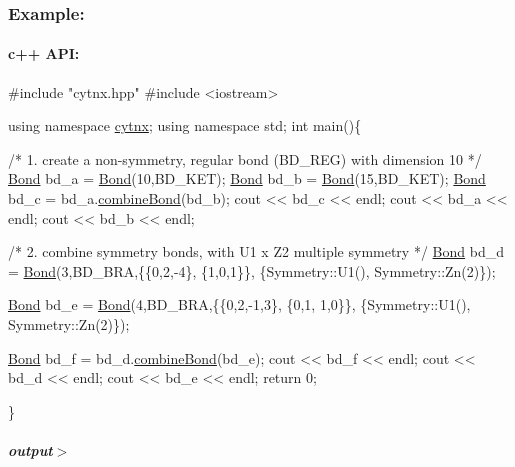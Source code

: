 \subsubsection*{Example\+:}

\paragraph*{c++ A\+PI\+:}


\begin{DoxyCodeInclude}
\textcolor{preprocessor}{#include "cytnx.hpp"}
\textcolor{preprocessor}{#include <iostream>}


\textcolor{keyword}{using namespace }\hyperlink{namespacecytnx}{cytnx};
\textcolor{keyword}{using namespace }std;
\textcolor{keywordtype}{int} main()\{ 

    \textcolor{comment}{/* 1.}
\textcolor{comment}{        create a non-symmetry, regular bond (BD\_REG) }
\textcolor{comment}{        with dimension 10}
\textcolor{comment}{    */}
    \hyperlink{classcytnx_1_1Bond}{Bond} bd\_a = \hyperlink{classcytnx_1_1Bond}{Bond}(10,BD\_KET);
    \hyperlink{classcytnx_1_1Bond}{Bond} bd\_b = \hyperlink{classcytnx_1_1Bond}{Bond}(15,BD\_KET);
    \hyperlink{classcytnx_1_1Bond}{Bond} bd\_c = bd\_a.\hyperlink{classcytnx_1_1Bond_a609c034885efa32fc244be82a56e1f8c}{combineBond}(bd\_b);
    cout << bd\_c << endl;
    cout << bd\_a << endl;
    cout << bd\_b << endl;

    \textcolor{comment}{/* 2.}
\textcolor{comment}{        combine symmetry bonds, }
\textcolor{comment}{        with U1 x Z2 multiple symmetry }
\textcolor{comment}{    */}
    \hyperlink{classcytnx_1_1Bond}{Bond} bd\_d = \hyperlink{classcytnx_1_1Bond}{Bond}(3,BD\_BRA,\{\{0,2,-4\},
                               \{1,0,1\}\},
                              \{Symmetry::U1(),
                               Symmetry::Zn(2)\});
                                
    \hyperlink{classcytnx_1_1Bond}{Bond} bd\_e = \hyperlink{classcytnx_1_1Bond}{Bond}(4,BD\_BRA,\{\{0,2,-1,3\},
                               \{0,1, 1,0\}\},
                              \{Symmetry::U1(),
                               Symmetry::Zn(2)\});

    \hyperlink{classcytnx_1_1Bond}{Bond} bd\_f = bd\_d.\hyperlink{classcytnx_1_1Bond_a609c034885efa32fc244be82a56e1f8c}{combineBond}(bd\_e);
    cout << bd\_f << endl;
    cout << bd\_d << endl;
    cout << bd\_e << endl;
    \textcolor{keywordflow}{return} 0;
    


\}

\end{DoxyCodeInclude}
 \subparagraph*{output$>$}


